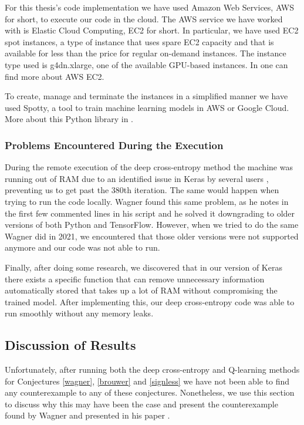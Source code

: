 \documentclass[11pt]{article}
\theoremstyle{definition}
\begin{document}
For this thesis's code implementation we have used Amazon Web Services, AWS for short, to execute our code in the cloud. The AWS service we have worked with is Elastic Cloud Computing, EC2 for short. In particular, we have used EC2 spot instances, a type of instance that uses spare EC2 capacity and that is available for less than the price for regular on-demand instances. The instance type used is g4dn.xlarge, one of the available GPU-based instances. In \cite{ec2} one can find more about AWS EC2.

To create, manage and terminate the instances in a simplified manner we have used Spotty, a tool to train machine learning models in AWS or Google Cloud. More about this Python library in \cite{spotty}.

\subsubsection{Problems Encountered During the Execution}

During the remote execution of the deep cross-entropy method the machine was running out of RAM due to an identified issue in Keras by several users \cite{memory_leak}, preventing us to get past the 380th iteration. The same would happen when trying to run the code locally. Wagner found this same problem, as he notes in the first few commented lines in his script \cite{wagner_code} and he solved it downgrading to older versions of both Python and TensorFlow. However, when we tried to do the same Wagner did in 2021, we encountered that those older versions were not supported anymore and our code was not able to run. 

Finally, after doing some research, we discovered that in our version of Keras there exists a specific function that can remove unnecessary information automatically stored that takes up a lot of RAM without compromising the trained model. After implementing this, our deep cross-entropy code was able to run smoothly without any memory leaks.

\subsection{Discussion of Results}

Unfortunately, after running both the deep cross-entropy and Q-learning methods for Conjectures \ref{wagner}, \ref{brouwer} and \ref{signless} we have not been able to find any counterexample to any of these conjectures. Nonetheless, we use this section to discuss why this may have been the case and present the counterexample found by Wagner and presented in his paper \cite{Wagner:2021}. 
\end{document}
